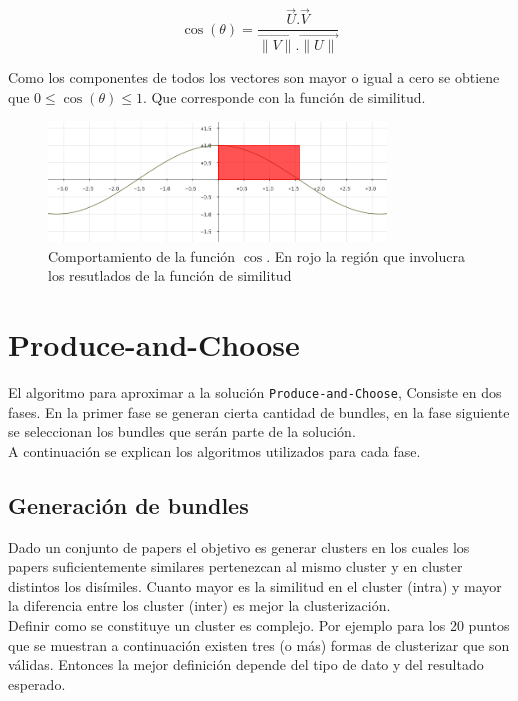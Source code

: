 \begin{equation} \label{eq:angulovectorial}
\cos(\theta) =  \dfrac{\overrightarrow{U} . \overrightarrow{V}}{\overrightarrow{\lVert V\lVert}.\overrightarrow{\lVert U\lVert}}
\end{equation}

Como los componentes de todos los vectores son mayor o igual a cero se obtiene que $0\leq\cos(\theta)\leq1$. Que corresponde con la función de similitud.

\begin{figure}[H]
\includegraphics[width=0.8\textwidth]{img/coseno.png}
\caption{Comportamiento de la función $\cos$. En rojo la región que involucra los resutlados de la función de similitud}
\label{bus:img-coseno}
\end{figure}


\section{Produce-and-Choose}
El algoritmo para aproximar a la solución \texttt{Produce-and-Choose}, Consiste en dos fases. En la primer fase se generan cierta cantidad de bundles, en la fase siguiente se seleccionan los bundles que serán parte de la solución.\\
A continuación se explican los algoritmos utilizados para cada fase.
\subsection{Generación de bundles}
Dado un conjunto de papers el objetivo es generar clusters en los cuales los papers suficientemente similares pertenezcan al mismo cluster y en cluster distintos los disímiles. Cuanto mayor es la similitud en el cluster (intra) y mayor la diferencia entre los cluster (inter) es mejor la clusterización.\\
Definir como se constituye un cluster es complejo. Por ejemplo para los 20 puntos que se muestran a continuación existen tres (o más) formas de clusterizar que son válidas. Entonces la mejor definición depende del tipo de dato y del resultado esperado.

